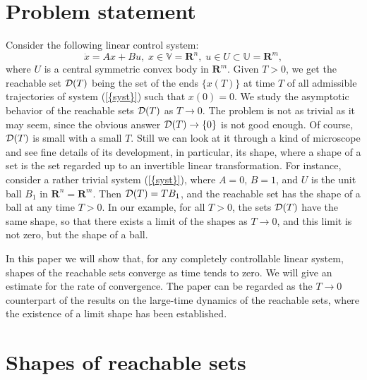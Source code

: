 \documentclass[final]{siamltex}
\begin{document}
\section{Problem statement}
Consider the following linear 
control system:
\begin{equation}\label{syst}
\dot x=Ax+Bu,\; x\in \mathbb{V}={{\mathbf R}}^n,\; u\in U\subset \mathbb{U}={{\mathbf R}}^m,
\end{equation}
where $U$ is a central symmetric convex  body in ${{\mathbf R}}^m$. \iffalse, i.e., $U$ is
a convex compact set with the non-empty interior, and $U=-U$. \fi Given $T>0$,
we get the reachable set ${\cal D}(T)$ being the set of the ends $\{x(T)\}$ at
time $T$ of all admissible trajectories of system {(\ref{{syst}})} such that
$x(0)=0.$ We study the asymptotic behavior of the reachable sets ${\cal D}(T)$
as $T\to 0$. The problem is not as trivial as it may seem, since the obvious
answer ${\cal D}(T)\to\{0\}$ is not good enough. Of course, ${\cal D}(T)$ is
small with a small $T$. Still we can look at it through a kind of microscope
and see fine details of its development, in particular, its shape, where a
shape of a set is the set regarded up to an invertible linear transformation.
For instance, consider a rather trivial system {(\ref{{syst}})}, where $A=0$,
$B=1$, and $U$ is the unit ball $B_1$ in ${{\mathbf R}}^n={{\mathbf R}}^m$. Then ${\cal D}(T)=TB_1$,
and the reachable set has the shape of a ball at any time $T>0$.
\iffalse , where the shape ${\mathop{\rm Sh}\nolimits}\Omega$ of any subset
$\Omega\subset{{\mathbf R}}^n$ is by definition the orbit of $\Omega$ under natural action
of the general linear group ${\mathop{\rm GL}\nolimits}_n({{\mathbf R}})$. \fi In our example,  for all $T>0$,
the sets ${\cal D}(T)$ have the same shape, so that
there exists a limit of the shapes as $T\rightarrow  0$, and this limit is not zero, but the shape of a ball. 

In this paper we will show that, for any completely controllable linear system, shapes of the
reachable sets converge as time tends to zero. We will give an estimate for the rate of convergence.
The paper can be regarded as the $T \to 0$ counterpart of the results \cite{ovs} on the large-time
dynamics of the reachable sets, where the existence of a limit shape
has been established.

\section{Shapes of reachable sets}\label{shapes section}
\end{document}
